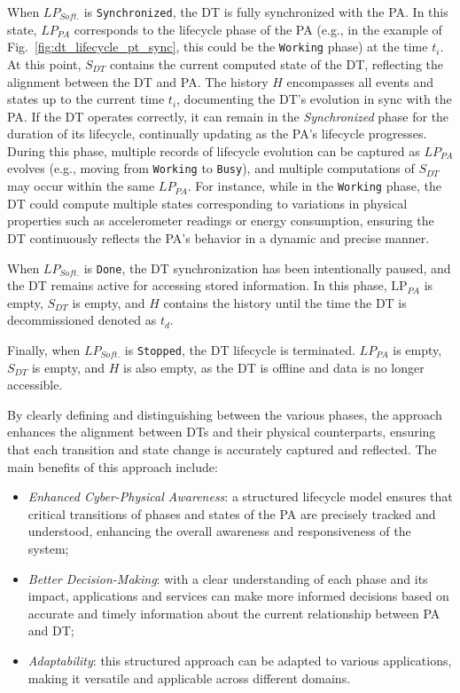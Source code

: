 When $LP_{Soft.}$  is \texttt{Synchronized}, the \ac{DT} is fully synchronized with the \ac{PA}.
In this state, $LP_{PA}$ corresponds to the lifecycle phase of the PA (e.g., in the example of Fig.~\ref{fig:dt_lifecycle_pt_sync}, this could be the \texttt{Working} phase) at the time $t_i$.
At this point, $S_{DT}$ contains the current computed state of the \ac{DT}, reflecting the alignment between the \ac{DT} and \ac{PA}.
The history $H$ encompasses all events and states up to the current time $t_{i}$, documenting the \ac{DT}'s evolution in sync with the PA.
If the \ac{DT} operates correctly, it can remain in the \textit{Synchronized} phase for the duration of its lifecycle, continually updating as the PA's lifecycle progresses.
During this phase, multiple records of lifecycle evolution can be captured as $LP_{PA}$ evolves (e.g., moving from \texttt{Working} to \texttt{Busy}), and multiple computations of $S_{DT}$ may occur within the same $LP_{PA}$.
For instance, while in the \texttt{Working} phase, the \ac{DT} could compute multiple states corresponding to variations in physical properties such as accelerometer readings or energy consumption, ensuring the \ac{DT} continuously reflects the PA's behavior in a dynamic and precise manner.

When $LP_{Soft.}$ is \texttt{Done}, the \ac{DT} synchronization has been intentionally paused, and the \ac{DT} remains active for accessing stored information. In this phase, $\text{LP}_{PA}$ is empty, $S_{DT}$ is empty, and $H$ contains the history until the time the \ac{DT} is decommissioned denoted as $t_{d}$.

Finally, when $LP_{Soft.}$ is \texttt{Stopped}, the \ac{DT} lifecycle is terminated. $LP_{PA}$ is empty, $S_{DT}$ is empty, and $H$ is also empty, as the \ac{DT} is offline and data is no longer accessible.

By clearly defining and distinguishing between the various phases, the approach enhances the alignment between \ac{DT}s and their physical counterparts, ensuring that each transition and state change is accurately captured and reflected.
The main benefits of this approach include: 
\begin{itemize}
    \item \textit{Enhanced Cyber-Physical Awareness}: a structured lifecycle model ensures that critical transitions of phases and states of the \ac{PA} are precisely tracked and understood, enhancing the overall awareness and responsiveness of the system;
    \item \textit{Better Decision-Making}: with a clear understanding of each phase and its impact, applications and services can make more informed decisions based on accurate and timely information about the current relationship between \ac{PA} and \ac{DT};
    \item \textit{Adaptability}: this structured approach can be adapted to various applications, making it versatile and applicable across different domains.
\end{itemize}

